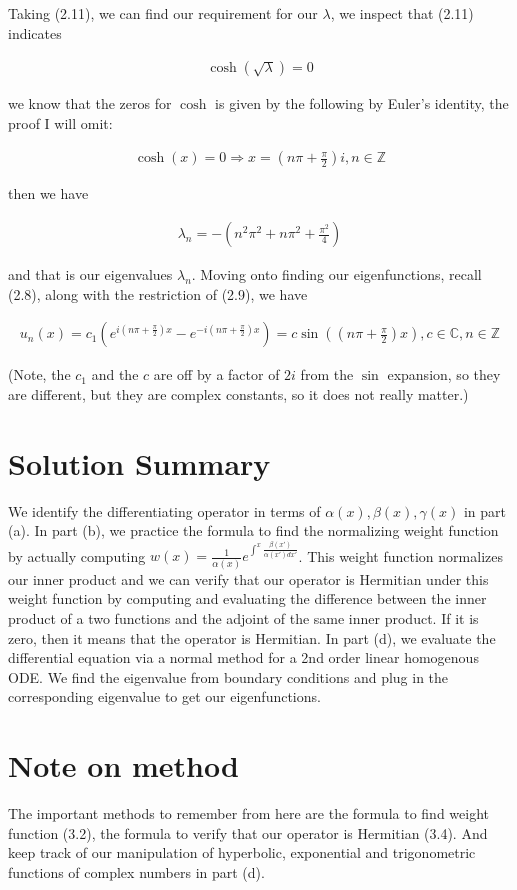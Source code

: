 \documentclass{article}
\numberwithin{equation}{section}
\begin{document}
Taking (2.11), we can find our requirement for our $\lambda$, we inspect that (2.11) indicates

\begin{align}
    \cosh (\sqrt{\lambda}) = 0
\end{align}

we know that the zeros for $\cosh$ is given by the following by Euler's identity, the proof I will omit:

\begin{align}
    \cosh(x) = 0 \Rightarrow x = (n\pi + \frac{\pi}{2}) i, n \in \mathbb{Z}
\end{align}

then we have

\begin{align}
    \lambda_n = - (n^2 \pi^2 + n \pi^2 + \frac{\pi^2}{4})
\end{align}

and that is our eigenvalues $\lambda_n$. Moving onto finding our eigenfunctions, recall (2.8), along with the restriction of (2.9), we have 

\begin{align}
    u_n (x) = c_1 (e^{i(n\pi + \frac{\pi}{2})x} - e^{- i(n\pi + \frac{\pi}{2})x})= c \sin((n\pi + \frac{\pi}{2})x), c \in \mathbb{C}, n \in \mathbb{Z} 
\end{align} 

(Note, the $c_1$ and the $c$ are off by a factor of $2i$ from the $\sin$ expansion, so they are different, but they are complex constants, so it does not really matter.)

\section{Solution Summary}
We identify the differentiating operator in terms of $\alpha(x), \beta(x), \gamma(x)$ in part (a). In part (b), we practice the formula to find the normalizing weight function by actually computing $w(x) = \frac{1}{\alpha(x)} e^{\int^{x} \frac{\beta(x')}{\alpha(x') dx'}}$. This weight function normalizes our inner product and we can verify that our operator is Hermitian under this weight function by computing and evaluating the difference between the inner product of a two functions and the adjoint of the same inner product. If it is zero, then it means that the operator is Hermitian. In part (d), we evaluate the differential equation via a normal method for a 2nd order linear homogenous ODE. We find the eigenvalue from boundary conditions and plug in the corresponding eigenvalue to get our eigenfunctions.

\section{Note on method}

The important methods to remember from here are the formula to find weight function (3.2), the formula to verify that our operator is Hermitian (3.4). And keep track of our manipulation of hyperbolic, exponential and trigonometric functions of complex numbers in part (d). 
\end{document}
